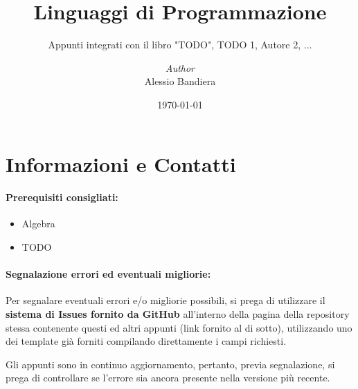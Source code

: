 \documentclass[a4paper, 12pt]{report}
\institute{\curlyquotes{\hspace{0.25mm}Sapienza} Università di Roma}
\title{Linguaggi di Programmazione}
\subtitle{Appunti integrati con il libro "TODO", TODO 1, Autore 2, ...}
\author{\textit{Author}\\Alessio Bandiera}
\date{\today}
\begin{document}
    \maketitle

    {
        \hypersetup{allcolors=black}

        \romantableofcontents
    }

    \chapter*{Informazioni e Contatti}      %
    
    \subsubsection{Prerequisiti consigliati:}
    \begin{itemize}
        \item Algebra
        \item TODO
    \end{itemize}

    \quad

    \subsubsection{Segnalazione errori ed eventuali migliorie:}
    
    Per segnalare eventuali errori e/o migliorie possibili, si prega di utilizzare il \textbf{sistema di Issues fornito da GitHub} all'interno della pagina della repository stessa contenente questi ed altri appunti (link fornito al di sotto), utilizzando uno dei template già forniti compilando direttamente i campi richiesti.

    Gli appunti sono in continuo aggiornamento, pertanto, previa segnalazione, si prega di controllare se l'errore sia ancora presente nella versione più recente.
\end{document}
